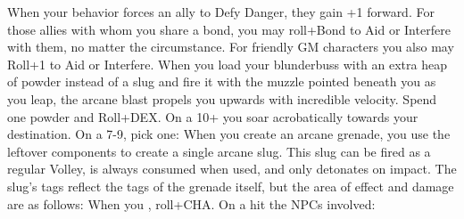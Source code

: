 \documentclass[darkmode]{dw_playbook}
\begin{document}
\pageThree
    {
        \advancedMovesCont
    }
    {
            {
            When your behavior forces an ally to Defy Danger, they gain +1 forward.  For those allies with whom you share a bond, you may roll+Bond to Aid or Interfere with them, no matter the circumstance.  For friendly GM characters you also may Roll+1 to Aid or Interfere.}
        \gap
            {
            When you load your blunderbuss with an extra heap of powder instead of a slug and fire it with the muzzle pointed beneath you as you leap, the arcane blast propels you upwards with incredible velocity.  Spend one powder and Roll+DEX.  On a 10+ you soar acrobatically towards your destination.  On a 7-9, pick one:
            \gapSm
            \gapSm
            }
        \gap
            {When you create an arcane grenade, you use the leftover components to create a single arcane slug.  This slug can be fired as a regular Volley, is always consumed when used, and only detonates on impact.  The slug’s tags reflect the tags of the grenade itself, but the area of effect and damage are as follows:
            \gapSm
            \gapSm
            \gapSm
            \gapSm
            \gapSm
            \gapSm
            }
            {When you , roll+CHA.  On a hit the NPCs involved:
            \gapSm
}}
\end{document}
